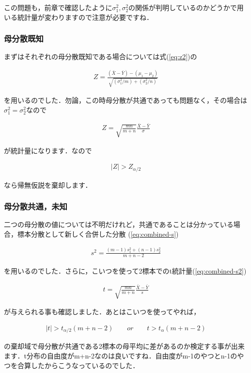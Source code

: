 \documentclass[11pt,a4paper]{ujreport} 	%
\begin{document}
この問題も，前章で確認したように$\sigma_1^2, \sigma_2^2$の関係が判明しているのかどうかで用いる統計量が変わりますので注意が必要ですね．

\subsubsection{母分散既知}
まずはそれぞれの母分散既知である場合については式(\ref{eq:z2})の

\begin{align}
  Z = \frac{(\bar{X} - \bar{Y})-(\mu_1-\mu_2)}{\sqrt{(\sigma_1^2/m)+(\sigma_2^2/n)}}
\end{align}

を用いるのでした．勿論，この時母分散が共通であっても問題なく，その場合は$\sigma_1^2=\sigma_2^2$なので

\begin{align}
  Z = \sqrt{\frac{mn}{m+n}} \frac{\bar{X}- \bar{Y}}{\sigma}
\end{align}

が統計量になります．なので

\begin{align}
  |Z| >Z_{\alpha/2}
\end{align}

なら帰無仮説を棄却します．

\subsubsection{母分散共通，未知}
二つの母分散の値については不明だけれど，共通であることは分かっている場合，標本分散として新しく合併した分散
(\ref{eq:combined-s})

\begin{align}
  s^2 = \frac{(m-1)s_1^2 + (n-1)s_2^2}{m+n-2}
\end{align}

を用いるのでした．さらに，こいつを使って2標本でのt統計量(\ref{eq:combined-s2})

\begin{align}
  t = \sqrt{\frac{mn}{m+n}} \frac{\bar{X}- \bar{Y}}{s}
\end{align}

が与えられる事も確認しました．あとはこいつを使ってやれば，

\begin{align}
  |t| > t_{\alpha/2}(m+n-2)\qquad or\qquad t>t_\alpha(m+n-2)
\end{align}

の棄却域で母分散が共通である2標本の母平均に差があるのか検定する事が出来ます．t分布の自由度がm+n-2なのは良いですね．自由度がm-1のやつとn-1のやつを合算したからこうなっているのでした．
\end{document}
